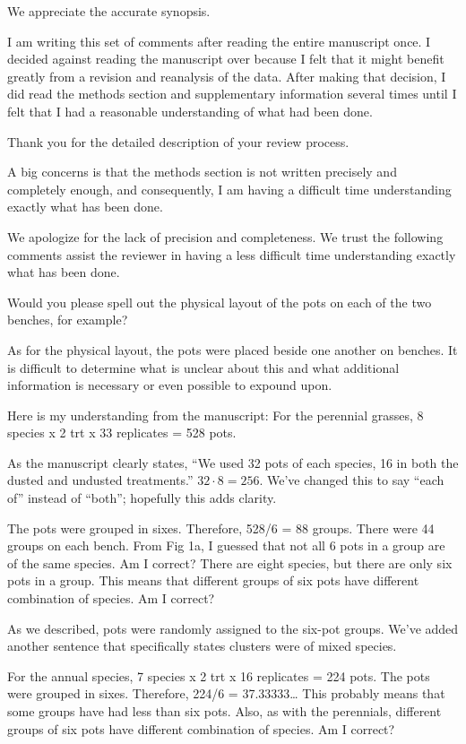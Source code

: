 \documentclass[parskip=half]{scrartcl}
\newcommand{\AR}[1]
	{\color{PineGreen}#1\color{black} \par }
\begin{document}
\AR{We appreciate the accurate synopsis.}

I am writing this set of comments after reading the entire manuscript once.
I decided against reading the manuscript over because I felt that it might benefit greatly from a revision and reanalysis of the data. After making that decision, I did read the methods section and supplementary information several times until I felt that I had a reasonable understanding of what had been done.

\AR{Thank you for the detailed description of your review process.}

A big concerns is that the methods section is not written precisely and completely enough, and consequently, I am having a difficult time understanding exactly what has been done.

\AR{We apologize for the lack of precision and completeness. We trust the following comments assist the reviewer in having a less difficult time understanding exactly what has been done.}

Would you please spell out the physical layout of the pots on each of the two benches, for example?

\AR{As for the physical layout, the pots were placed beside one another on benches. It is difficult to determine what is unclear about this and what additional information is necessary or even possible to expound upon.}

Here is my understanding from the manuscript: For the perennial grasses, 8 species x 2 trt x 33 replicates = 528 pots. 

\AR{As the manuscript clearly states, ``We used 32 pots of each species, 16 in both the dusted and undusted treatments.'' $32 \cdot 8 = 256$. We've changed this to say ``each of'' instead of ``both''; hopefully this adds clarity.} 

 The pots were grouped in sixes. Therefore, 528/6 = 88 groups. There were 44 groups on each bench. From Fig 1a, I guessed that not all 6 pots in a group are of the same species. Am I correct? There are eight species, but there are only six pots in a group. This means that different groups of six pots have different combination of species. Am I correct?

\AR{As we described, pots were randomly assigned to the six-pot groups. We've added another sentence that specifically states clusters were of mixed species.} 

For the annual species, 7 species x 2 trt x 16 replicates = 224 pots. The pots were grouped in sixes. Therefore, 224/6 = 37.33333… This probably means that some groups have had less than six pots. Also, as with the perennials, different groups of six pots have different combination of species. Am I correct?
\end{document}
